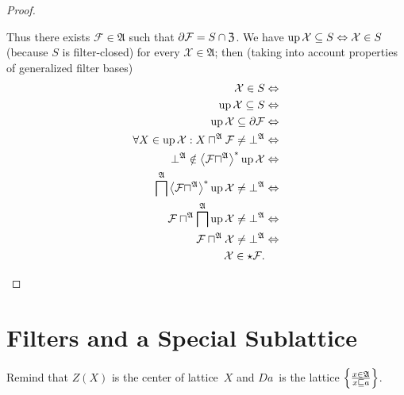 \begin{proof}
\begin{description}
\begin{description}
Thus there exists $\mathcal{F}\in\mathfrak{A}$ such that $\partial\mathcal{F}=S\cap\mathfrak{Z}$.
We have $\operatorname{up}\mathcal{X}\subseteq S\Leftrightarrow\mathcal{X}\in S$
(because $S$ is filter-closed) for every $\mathcal{X}\in\mathfrak{A}$;
then (taking into account properties of generalized filter bases)
\begin{align*}
\mathcal{X}\in S & \Leftrightarrow\\
\operatorname{up}\mathcal{X}\subseteq S & \Leftrightarrow\\
\operatorname{up}\mathcal{X}\subseteq\partial\mathcal{F} & \Leftrightarrow\\
\forall X\in\operatorname{up}\mathcal{X}:X\sqcap^{\mathfrak{A}}\mathcal{F}\ne\bot^{\mathfrak{A}} & \Leftrightarrow\\
\bot^{\mathfrak{A}}\notin\left\langle \mathcal{F}\sqcap^{\mathfrak{A}}\right\rangle ^{\ast}\operatorname{up}\mathcal{X} & \Leftrightarrow\\
\bigsqcap^{\mathfrak{A}}\left\langle \mathcal{F}\sqcap^{\mathfrak{A}}\right\rangle ^{\ast}\operatorname{up}\mathcal{X}\ne\bot^{\mathfrak{A}} & \Leftrightarrow\\
\mathcal{F}\sqcap^{\mathfrak{A}}\bigsqcap^{\mathfrak{A}}\operatorname{up}\mathcal{X}\ne\bot^{\mathfrak{A}} & \Leftrightarrow\\
\mathcal{F}\sqcap^{\mathfrak{A}}\mathcal{X}\ne\bot^{\mathfrak{A}} & \Leftrightarrow\\
\mathcal{X}\in\star\mathcal{F}.
\end{align*}


\end{description}
\end{description}
\end{proof}

\section{Filters and a Special Sublattice}

Remind that $Z(X)$ is the center of lattice~$X$ and $Da$~is the lattice $\left\{ \frac{x\in\mathfrak{A}}{x\sqsubseteq a}\right\}$.

